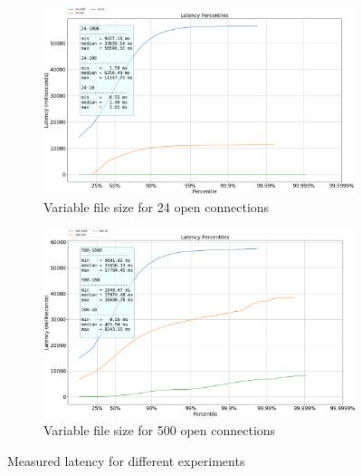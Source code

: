 \documentclass[runningheads]{llncs}
\begin{document}
\begin{figure}[p]
  \begin{subfigure}[t]{0.7\textwidth}
        \includegraphics[width=1\textwidth]{plotcon24.png}\vspace{-0.2em}
        \caption{Variable file size for 24 open connections}\vspace{-0.2em}
		\label {fig:latency-to-size-24}
  \end{subfigure}
  \begin{subfigure}[t]{0.7\textwidth}
        \includegraphics[width=1\textwidth]{plotcon500.png}\vspace{-0.2em}
        \caption{Variable file size for 500 open connections}\vspace{-0.2em}
		\label {fig:latency-to-size-500}
  \end{subfigure}

\caption{Measured latency for different experiments}
\end{figure}
\end{document}
